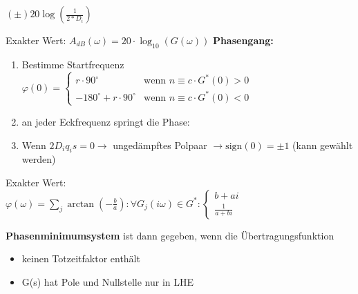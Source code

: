 \begin{tcolorbox}[colback=white!10!white,colframe=blue!50!white,title=Konstruktionsregeln]
\begin{enumerate}
        $(\pm)20\log(\frac{1}{2*D_i})$
    \end{enumerate}
    Exakter Wert: $A_{dB}(\omega) = 20 \cdot \log_{10} \left(G(\omega)\right)$
    \tcblower
    \textbf{Phasengang:}
    \begin{enumerate}
        \item Bestimme Startfrequenz\\
        $\varphi(0) = \begin{cases}
    r\cdot 90^\circ &\mbox{wenn } n \equiv c\cdot G^*(0)>0\\
    -180^\circ+r\cdot 90^\circ & \mbox{wenn } n \equiv c\cdot G^*(0)<0
        \end{cases} $
        \item an jeder Eckfrequenz springt die Phase:
        \item Wenn $2D_iq_is = 0 \rightarrow$ ungedämpftes Polpaar $\rightarrow\mbox{sign}(0) = \pm 1$ (kann gewählt werden)
    \end{enumerate}
    Exakter Wert: \\
        $\varphi(\omega) = \sum\limits_{j} \arctan\left(-\frac{b}{a}\right)
        : \forall G_j(i\omega) \in G^* : \begin{cases}
            b + ai \\
            \frac{1}{a + bi}
        \end{cases}$
\end{tcolorbox}

\begin{tcolorbox}[colback=white!10!white,colframe=green!30!black,title=Phasenminimumsystem]
\textbf{Phasenminimumsystem} ist dann gegeben, wenn die Übertragungsfunktion
\begin{itemize}
    \item keinen Totzeitfaktor enthält
    \item G(s) hat Pole und Nullstelle nur in LHE
\end{itemize}
\end{tcolorbox}
